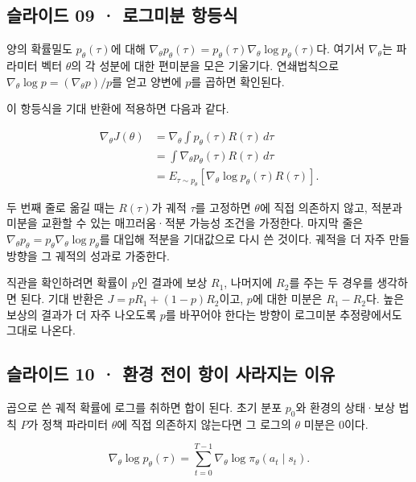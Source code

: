 \documentclass[11pt,a4paper]{article}
\begin{document}
\subsection{슬라이드 09 · 로그미분 항등식}

양의 확률밀도 $p_\theta(\tau)$에 대해 $\nabla_\theta p_\theta(\tau)=p_\theta(\tau)\nabla_\theta\log p_\theta(\tau)$다. 여기서 $\nabla_\theta$는 파라미터 벡터 $\theta$의 각 성분에 대한 편미분을 모은 기울기다. 연쇄법칙으로 $\nabla_\theta\log p=(\nabla_\theta p)/p$를 얻고 양변에 $p$를 곱하면 확인된다.\par

이 항등식을 기대 반환에 적용하면 다음과 같다.\par

\[
\begin{aligned}
\nabla_\theta J(\theta)
&=\nabla_\theta\int p_\theta(\tau)R(\tau)\,d\tau\\
&=\int \nabla_\theta p_\theta(\tau)R(\tau)\,d\tau\\
&=E_{\tau\sim p_\theta}\!\left[
\nabla_\theta\log p_\theta(\tau)R(\tau)\right].
\end{aligned}
\]

두 번째 줄로 옮길 때는 $R(\tau)$가 궤적 $\tau$를 고정하면 $\theta$에 직접 의존하지 않고, 적분과 미분을 교환할 수 있는 매끄러움·적분 가능성 조건을 가정한다. 마지막 줄은 $\nabla_\theta p_\theta=p_\theta\nabla_\theta\log p_\theta$를 대입해 적분을 기대값으로 다시 쓴 것이다. 궤적을 더 자주 만들 방향을 그 궤적의 성과로 가중한다.\par

직관을 확인하려면 확률이 $p$인 결과에 보상 $R_1$, 나머지에 $R_2$를 주는 두 경우를 생각하면 된다. 기대 반환은 $J=pR_1+(1-p)R_2$이고, $p$에 대한 미분은 $R_1-R_2$다. 높은 보상의 결과가 더 자주 나오도록 $p$를 바꾸어야 한다는 방향이 로그미분 추정량에서도 그대로 나온다.\par

\subsection{슬라이드 10 · 환경 전이 항이 사라지는 이유}

곱으로 쓴 궤적 확률에 로그를 취하면 합이 된다. 초기 분포 $p_0$와 환경의 상태·보상 법칙 $P$가 정책 파라미터 $\theta$에 직접 의존하지 않는다면 그 로그의 $\theta$ 미분은 0이다.\par

\[
\nabla_\theta\log p_\theta(\tau)
=\sum_{t=0}^{T-1}\nabla_\theta\log\pi_\theta(a_t\mid s_t).
\]
\end{document}
